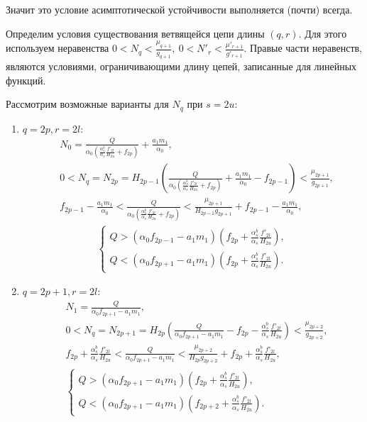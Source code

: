 Значит это условие асимптотической устойчивости выполняется (почти) всегда.

Определим условия существования ветвящейся цепи длины \((q, r)\). Для этого используем неравенства \(0 < N_q < \frac{\mu_{q+1}}{g_{q+1}}, ~ 0 < N'_r < \frac{\mu'_{r+1}}{g'_{r+1}}\). Правые части неравенств, являются условиями, ограничивающими длину цепей, записанные для линейных функций. 

Рассмотрим возможные варианты для \(N_q\) при \(s=2u\):
\begin{enumerate}
    \item \(q = 2p, r = 2l\): 
    \begin{align*}
        & N_0 = \frac{Q}{\alpha_0 \left( \frac{\alpha^b_s}{\alpha_s} \frac{f'_{2l}}{H_{2u}} + f_{2p} \right)} + \frac{a_1 m_1}{\alpha_0}, \\
        & 0 < N_q = N_{2p} = H_{2p-1} \left( \frac{Q}{\alpha_0 \left( \frac{\alpha^b_s}{\alpha_s} \frac{f'_{2l}}{H_{2u}} + f_{2p} \right)} + \frac{a_1 m_1}{\alpha_0} - f_{2p-1} \right) < \frac{\mu_{2p+1}}{g_{2p+1}}, \\
        & f_{2p-1} - \frac{a_1 m_1}{\alpha_0} < \frac{Q}{\alpha_0 \left( \frac{\alpha^b_s}{\alpha_s} \frac{f'_{2l}}{H_{2u}} + f_{2p} \right)} < \frac{\mu_{2p+1}}{H_{2p-1} g_{2p+1}} + f_{2p-1} - \frac{a_1 m_1}{\alpha_0},
    \end{align*}
    \begin{align*}
        \begin{cases}
            Q > \left( \alpha_0 f_{2p-1} - a_1 m_1 \right) \left( f_{2p} + \frac{\alpha^b_s}{\alpha_s} \frac{f'_{2l}}{H_{2u}} \right), \\
            Q < \left( \alpha_0 f_{2p+1} - a_1 m_1 \right) \left( f_{2p} + \frac{\alpha^b_s}{\alpha_s} \frac{f'_{2l}}{H_{2u}} \right).
        \end{cases}
    \end{align*}

    \item \(q = 2p+1, r = 2l\):
    \begin{align*}
        & N_1 = \frac{Q}{\alpha_0 f_{2p+1} - a_1 m_1}, \\
        & 0 < N_{q} = N_{2p+1} = H_{2p} \left( \frac{Q}{\alpha_0 f_{2p+1} - a_1 m_1} - f_{2p} - \frac{\alpha^b_s}{\alpha_s} \frac{f'_{2l}}{H_{2u}} \right) < \frac{\mu_{2p+2}}{g_{2p+2}}, \\
        & f_{2p} + \frac{\alpha^b_s}{\alpha_s} \frac{f'_{2l}}{H_{2u}} < \frac{Q}{\alpha_0 f_{2p+1} - a_1 m_1} < \frac{\mu_{2p+2}}{H_{2p} g_{2p+2}} + f_{2p} + \frac{\alpha^b_s}{\alpha_s} \frac{f'_{2l}}{H_{2u}}, \\
        & \begin{cases}
            Q > \left( \alpha_0  f_{2p+1} - a_1 m_1 \right) \left( f_{2p} + \frac{\alpha^b_s}{\alpha_s} \frac{f'_{2l}}{H_{2u}} \right), \\
            Q < \left( \alpha_0 f_{2p+1} - a_1 m_1 \right) \left( f_{2p+2} + \frac{\alpha^b_s}{\alpha_s} \frac{f'_{2l}}{H_{2u}} \right).
        \end{cases}
    \end{align*}


\end{enumerate}
